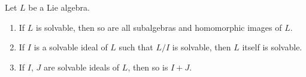 Let $L$ be a Lie algebra.

\begin{enumerate}
\item[(a)] If $L$ is solvable, then so are all subalgebras and homomorphic images of $L$.
\item[(b)] If $I$ is a solvable ideal of $L$ such that $L/I$ is solvable, then $L$ itself is solvable.
\item[(c)] If $I$, $J$ are solvable ideals of $L$, then so is $I+J$.
\end{enumerate}
